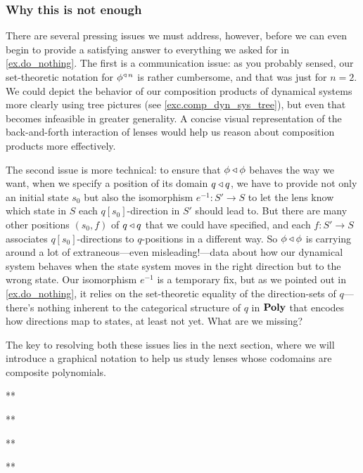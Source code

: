 \documentclass[Book-Poly]{subfiles}
\begin{document}
\subsubsection{Why this is not enough}\label{subsubsec.comon.comp.def.dyn_sys.issues}
There are several pressing issues we must address, however, before we can even begin to provide a satisfying answer to everything we asked for in \cref{ex.do_nothing}.
The first is a communication issue: as you probably sensed, our set-theoretic notation for $\phi^{\mathbin{\triangleleft}\,n}$ is rather cumbersome, and that was just for $n=2$.
We could depict the behavior of our composition products of dynamical systems more clearly using tree pictures (see \cref{exc.comp_dyn_sys_tree}), but even that becomes infeasible in greater generality.
A concise visual representation of the back-and-forth interaction of lenses would help us reason about composition products more effectively.

The second issue is more technical: to ensure that $\phi\mathbin{\triangleleft}\phi$ behaves the way we want, when we specify a position of its domain $q\mathbin{\triangleleft} q$, we have to provide not only an initial state $s_0$ but also the isomorphism $e^{-1}\colon S'\to S$ to let the lens know which state in $S$ each $q[s_0]$-direction in $S'$ should lead to.
But there are many other positions $(s_0,f)$ of $q\mathbin{\triangleleft} q$ that we could have specified, and each $f\colon S'\to S$ associates $q[s_0]$-directions to $q$-positions in a different way.
So $\phi\mathbin{\triangleleft}\phi$ is carrying around a lot of extraneous---even misleading!---data about how our dynamical system behaves when the state system moves in the right direction but to the wrong state.
Our isomorphism $e^{-1}$ is a temporary fix, but as we pointed out in \cref{ex.do_nothing}, it relies on the set-theoretic equality of the direction-sets of $q$---there's nothing inherent to the categorical structure of $q$ in $\mathbf{Poly}$ that encodes how directions map to states, at least not yet.
What are we missing?

The key to resolving both these issues lies in the next section, where we will introduce a graphical notation to help us study lenses whose codomains are composite polynomials.

\begin{exercise} \label{exc.comp_dyn_sys_tree}
** %
\begin{solution}
**
\end{solution}
\end{exercise}


\begin{exercise} \label{exc.comp_interface}
** %
\begin{solution}
**
\end{solution}
\end{exercise}
\end{document}
